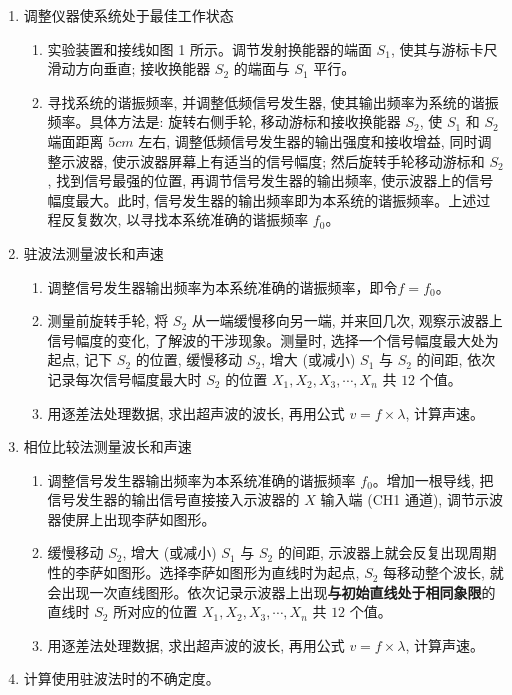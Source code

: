 \documentclass[12pt,a4paper]{article}
\begin{document}
	\begin{enumerate}
		\item 调整仪器使系统处于最佳工作状态
		
		\begin{enumerate}
			\item 实验装置和接线如图 1 所示。调节发射换能器的端面 $S_{1}$, 使其与游标卡尺滑动方向垂直; 接收换能器 $S_{2}$ 的端面与 $S_{1}$ 平行。
			\item 寻找系统的谐振频率, 并调整低频信号发生器, 使其输出频率为系统的谐振频率。具体方法是: 旋转右侧手轮, 移动游标和接收换能器 $S_{2}$, 使 $S_{1}$ 和 $S_{2}$ 端面距离 $5cm$ 左右, 调整低频信号发生器的输出强度和接收增益, 同时调整示波器, 使示波器屏幕上有适当的信号幅度; 然后旋转手轮移动游标和 $S_{2}$, 找到信号最强的位置, 再调节信号发生器的输出频率, 使示波器上的信号幅度最大。此时, 信号发生器的输出频率即为本系统的谐振频率。上述过程反复数次, 以寻找本系统准确的谐振频率 $f_{0}$。
		\end{enumerate}

		\item 驻波法测量波长和声速
		
			\begin{enumerate}
				\item 调整信号发生器输出频率为本系统准确的谐振频率，即令$f = f_{0}$。
				\item 测量前旋转手轮, 将 $S_{2}$ 从一端缓慢移向另一端, 并来回几次, 观察示波器上信号幅度的变化, 了解波的干涉现象。测量时, 选择一个信号幅度最大处为起点, 记下 $S_{2}$ 的位置, 缓慢移动 $S_{2}$, 增大 (或减小) $S_{1}$ 与 $S_{2}$ 的间距, 依次记录每次信号幅度最大时 $S_{2}$ 的位置 $X_{1}, X_{2}, X_{3}, \cdots, X_{n}$ 共 $12$ 个值。
				\item 用逐差法处理数据, 求出超声波的波长, 再用公式 $v=f\times\lambda$, 计算声速。
			\end{enumerate}

		\item 相位比较法测量波长和声速
		
			\begin{enumerate}
				\item 调整信号发生器输出频率为本系统准确的谐振频率 $f_{0}$。增加一根导线, 把信号发生器的输出信号直接接入示波器的 $X$ 输入端 (CH1 通道), 调节示波器使屏上出现李萨如图形。
				\item 缓慢移动 $S_{2}$, 增大 (或减小) $S_{1}$ 与 $S_{2}$ 的间距, 示波器上就会反复出现周期性的李萨如图形。选择李萨如图形为直线时为起点, $S_{2}$ 每移动整个波长, 就会出现一次直线图形。依次记录示波器上出现\textbf{与初始直线处于相同象限}的直线时 $S_{2}$ 所对应的位置 $X_{1}, X_{2}, X_{3}, \cdots, X_{n}$ 共 $12$ 个值。
				\item 用逐差法处理数据, 求出超声波的波长, 再用公式 $v=f\times\lambda$, 计算声速。
			\end{enumerate}

		\item 计算使用驻波法时的不确定度。
		
	\end{enumerate}
	
\end{document}
